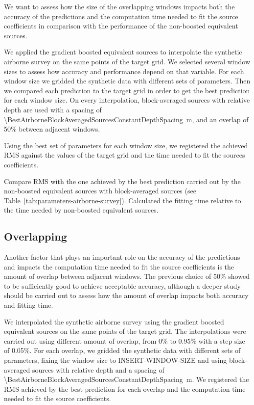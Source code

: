 \documentclass[twocolumn]{article}
\begin{document}
We want to assess how the size of the overlapping windows impacts both the
accuracy of the predictions and the computation time needed to fit the source
coefficients in comparison with the performance of the non-boosted equivalent
sources.

We applied the gradient boosted equivalent sources to interpolate the synthetic
airborne survey on the same points of the target grid.
We selected several window sizes to assess how accuracy and performance depend
on that variable.
For each window size we gridded the synthetic data with different sets of
parameters. Then we compared each prediction to the target grid in order to get
the best prediction for each window size.
On every interpolation, block-averaged sources with relative depth are used
with a spacing of
\SI{\BestAirborneBlockAveragedSourcesConstantDepthSpacing}{\meter}, and an
overlap of 50\% between adjacent windows.

Using the best set of parameters for each window size, we registered the
achieved RMS against the values of the target grid and the time needed to fit
the sources coefficients.

Compare RMS with the one achieved by the best prediction carried out by the
non-boosted equivalent sources with block-averaged sources (see
Table~\ref{tab:parameters-airborne-survey}).
Calculated the fitting time relative to the time needed by non-boosted
equivalent sources.

\subsection{Overlapping}

Another factor that plays an important role on the accuracy of the predictions
and impacts the computation time needed to fit the source coefficients is the
amount of overlap between adjacent windows.
The previous choice of 50\% showed to be sufficiently good to achieve
acceptable accuracy, although a deeper study should be carried out to assess
how the amount of overlap impacts both accuracy and fitting time.

We interpolated the synthetic airborne survey using the gradient boosted
equivalent sources on the same points of the target grid.
The interpolations were carried out using different amount of overlap, from
0\% to 0.95\% with a step size of 0.05\%.
For each overlap, we gridded the synthetic data with different sets of
parameters, fixing the window size to INSERT-WINDOW-SIZE and using
block-averaged sources with relative depth and a spacing of
\SI{\BestAirborneBlockAveragedSourcesConstantDepthSpacing}{\meter}.
We registered the RMS achieved by the best prediction for each overlap and the
computation time needed to fit the source coefficients.
\end{document}
